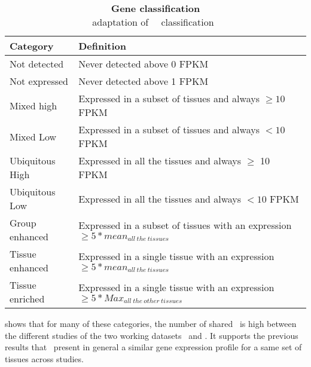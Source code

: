 \begin{table}[!htpb]
\centering
\caption[Gene classification]{\textbf{Gene classification}\label{tab:UhlenCat}\\
\footnotesize{adaptation of \uhlen\ \etal\ classification~}}
\begin{tabular}{@{}ll@{}}
\toprule
Category        & Definition                                                                                           \\ \midrule
Not detected    & Never detected above 0 FPKM                                                                    \\
Not expressed   & Never detected above 1 FPKM                                                                    \\
Mixed high      & Expressed in a subset of tissues and always $\geq 10$ FPKM                                     \\
Mixed Low       & Expressed in a subset of tissues and always $< 10$ FPKM                                 \\
Ubiquitous High & Expressed in all the tissues and always $\geq$ 10 FPKM                                         \\
Ubiquitous Low  & Expressed in all the tissues and always $< 10$ FPKM                                     \\
Group enhanced  & Expressed in a subset of tissues with an expression $\geq 5*mean_{all~the~tissues}$             \\
Tissue enhanced & Expressed in a single tissue with an expression $\geq 5*mean_{all~the~tissues}$                 \\
Tissue enriched & Expressed in a single tissue with an expression $\geq 5*Max_{all~the~other~tissues}$ \\ \bottomrule
\end{tabular}
\end{table}

 shows that for many of these categories,
the number of shared \pcgs\ is high between the different studies of the
two working datasets \setOne\ and \setTwo.
It supports the previous results that \pcgs\ present in general a similar
gene expression profile for a same set of tissues across studies.\mybr\


